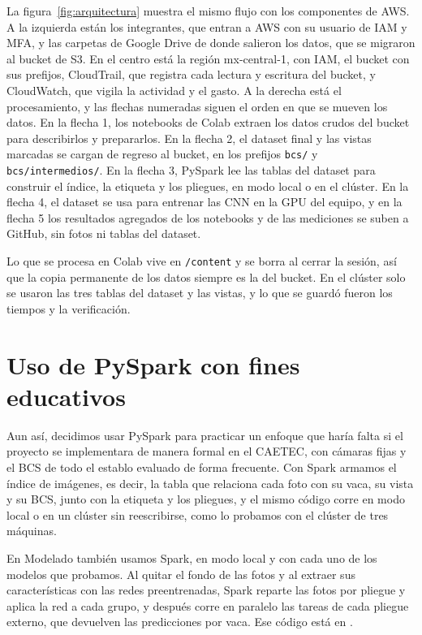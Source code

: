 \documentclass[11pt,letterpaper,DIV=12]{scrartcl}
\begin{document}
La figura~\ref{fig:arquitectura} muestra el mismo flujo con los componentes de AWS. A la izquierda están los integrantes, que entran a AWS con su usuario de IAM y MFA, y las carpetas de Google Drive de donde salieron los datos, que se migraron al bucket de S3. En el centro está la región mx-central-1, con IAM, el bucket con sus prefijos, CloudTrail, que registra cada lectura y escritura del bucket, y CloudWatch, que vigila la actividad y el gasto. A la derecha está el procesamiento, y las flechas numeradas siguen el orden en que se mueven los datos. En la flecha 1, los notebooks de Colab extraen los datos crudos del bucket para describirlos y prepararlos. En la flecha 2, el dataset final y las vistas marcadas se cargan de regreso al bucket, en los prefijos \nolinkurl{bcs/} y \nolinkurl{bcs/intermedios/}. En la flecha 3, PySpark lee las tablas del dataset para construir el índice, la etiqueta y los pliegues, en modo local o en el clúster. En la flecha 4, el dataset se usa para entrenar las CNN en la GPU del equipo, y en la flecha 5 los resultados agregados de los notebooks y de las mediciones se suben a GitHub, sin fotos ni tablas del dataset.

Lo que se procesa en Colab vive en \nolinkurl{/content} y se borra al cerrar la sesión, así que la copia permanente de los datos siempre es la del bucket. En el clúster solo se usaron las tres tablas del dataset y las vistas, y lo que se guardó fueron los tiempos y la verificación.



\section{Uso de PySpark con fines educativos}

Aun así, decidimos usar PySpark para practicar un enfoque que haría falta si el proyecto se implementara de manera formal en el CAETEC, con cámaras fijas y el BCS de todo el establo evaluado de forma frecuente. Con Spark armamos el índice de imágenes, es decir, la tabla que relaciona cada foto con su vaca, su vista y su BCS, junto con la etiqueta y los pliegues, y el mismo código corre en modo local o en un clúster sin reescribirse, como lo probamos con el clúster de tres máquinas.

En Modelado también usamos Spark, en modo local y con cada uno de los modelos que probamos. Al quitar el fondo de las fotos y al extraer sus características con las redes preentrenadas, Spark reparte las fotos por pliegue y aplica la red a cada grupo, y después corre en paralelo las tareas de cada pliegue externo, que devuelven las predicciones por vaca. Ese código está en .
\end{document}
